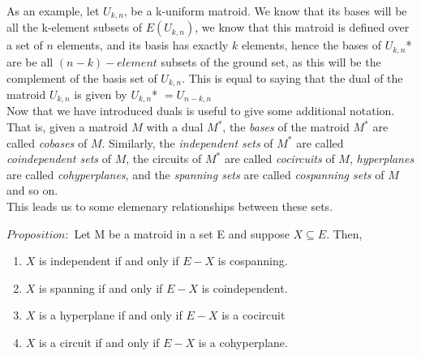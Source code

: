 As an example, let $U_{k,n}$, be a k-uniform matroid. We know that its bases will be all the k-element subsets of $E(U_{k,n})$, we know that this matroid is defined over a set of $n$ elements, and its basis has exactly $k$ elements, hence the bases of $U_{k,n}$* are be all $(n-k)-element$ subsets of the ground set, as this will be the complement of the basis set of $U_{k,n}$. This is equal to saying that the dual of the matroid $U_{k,n}$ is given by $U_{k,n}$* $= U_{n-k,n}$\\


Now that we have introduced duals is useful to give some additional notation. That is, given a matroid $M$ with a dual $M^*$, the \textit{bases} of the matroid $M^*$ are called \textit{cobases} of $M$. Similarly, the \textit{independent sets} of $M^*$ are called \textit{coindependent sets} of $M$, the circuits of $M^*$ are called \textit{cocircuits} of $M$, \textit{hyperplanes} are called \textit{cohyperplanes}, and the \textit{spanning sets} are called \textit{cospanning sets} of $M$ and so on.\\

This leads us to some elemenary relationships between these sets. 

$Proposition:$ Let M be a matroid in a set E and suppose $X \subseteq E$. Then,
    \begin{enumerate}
        \item $X$ is independent if and only if $E-X$ is cospanning.

        \item $X$ is spanning if and only if $E-X$ is coindependent.

        \item $X$ is a hyperplane if and only if $E-X$ is a cocircuit

        \item $X$ is a circuit if and only if $E-X$ is a cohyperplane.
    \end{enumerate}

